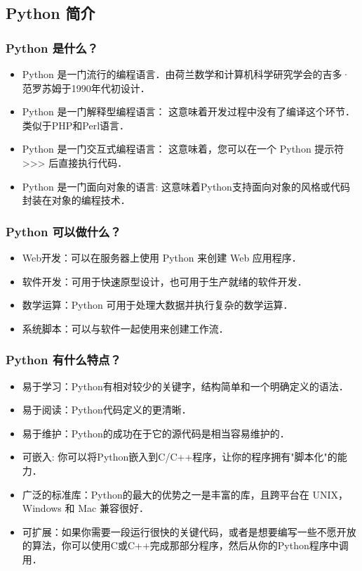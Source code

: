 
\begin{issues}
\issueTODO
\end{issues}

\subsection{Python 简介}

\subsubsection{Python 是什么？}

\begin{itemize}
\item Python 是一门流行的编程语言．由荷兰数学和计算机科学研究学会的吉多·范罗苏姆于1990年代初设计．
\item Python 是一门解释型编程语言： 这意味着开发过程中没有了编译这个环节．类似于PHP和Perl语言．
\item Python 是一门交互式编程语言： 这意味着，您可以在一个 Python 提示符 >>> 后直接执行代码．
\item Python 是一门面向对象的语言: 这意味着Python支持面向对象的风格或代码封装在对象的编程技术．
\end{itemize}
 
\subsubsection{Python 可以做什么？}
\begin{itemize}
\item Web开发：可以在服务器上使用 Python 来创建 Web 应用程序．
\item 软件开发：可用于快速原型设计，也可用于生产就绪的软件开发．
\item 数学运算：Python 可用于处理大数据并执行复杂的数学运算．
\item 系统脚本：可以与软件一起使用来创建工作流．
\end{itemize}

\subsubsection{Python 有什么特点？}

\begin{itemize}
\item 易于学习：Python有相对较少的关键字，结构简单和一个明确定义的语法．
\item 易于阅读：Python代码定义的更清晰．
\item 易于维护：Python的成功在于它的源代码是相当容易维护的．
\item 可嵌入: 你可以将Python嵌入到C/C++程序，让你的程序拥有"脚本化"的能力．
\item 广泛的标准库：Python的最大的优势之一是丰富的库，且跨平台在 UNIX，Windows 和 Mac 兼容很好．
\item 可扩展：如果你需要一段运行很快的关键代码，或者是想要编写一些不愿开放的算法，你可以使用C或C++完成那部分程序，然后从你的Python程序中调用．
\end{itemize}

